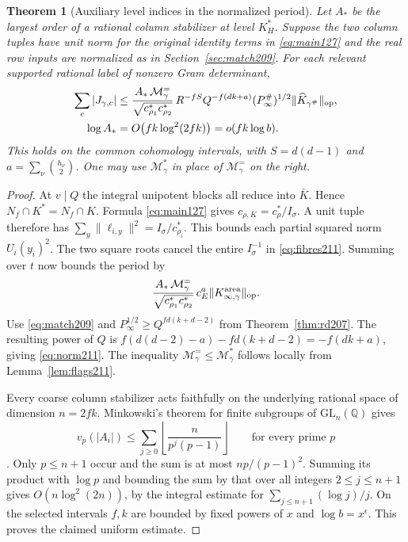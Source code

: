 \documentclass[a4paper,11pt]{article}
\newtheorem{theorem}[proposition]{Theorem}
\theoremstyle{definition}
\theoremstyle{remark}
\numberwithin{equation}{section}
\begin{document}
\begin{theorem}[Auxiliary level indices in the normalized period]
\label{thm:norm211}
Let \(A_*\) be the largest order of a rational column stabilizer
at level \(K_H^*\). Suppose the two column tuples have unit norm
for the original identity terms in \eqref{eq:main127} and the real
row inputs are normalized as in Section~\ref{sec:match209}. For
each relevant supported rational label of nonzero Gram determinant,
\begin{align}
 \sum_c|J_{\gamma,c}|
 &\le \frac{A_*\,\mathcal M_\gamma^{=}}
            {\sqrt{c_{\rho_1}^*c_{\rho_2}^*}}\,
    R^{-fS}Q^{-f(dk+a)}
       (P^\#_\infty)^{1/2}\|\widehat K_{\gamma^\#}\|_{\rm op},
                                                      \label{eq:norm211}\\
 \log A_*&=O\bigl(fk\log^2(2fk)\bigr)=o(fk\log b).
 \notag
\end{align}
This holds on the common cohomology intervals, with \(S=d(d-1)\)
and \(a=\sum_\nu\binom{h_\nu}{2}\). One may use
\(\mathcal M_\gamma^*\) in place of \(\mathcal M_\gamma^{=}\) on
the right.
\end{theorem}
\begin{proof}
At \(v\mid Q\) the integral unipotent blocks all reduce into
\(\bar K\). Hence \(N_f\cap K^*=N_f\cap K\). Formula
\eqref{eq:main127} gives \(c_{\rho,K}=c_\rho^*/I_\sigma\).
A unit tuple therefore has
\(\sum_y\|\ell_{i,y}\|^2=I_\sigma/c_{\rho_i}^*\). This bounds
each partial squared norm \(U_i(y_i)^2\). The two square roots
cancel the entire \(I_\sigma^{-1}\) in \eqref{eq:fibres211}.
Summing over \(t\) now bounds the period by
\[
   \frac{A_*\,\mathcal M_\gamma^{=}}
        {\sqrt{c_{\rho_1}^*c_{\rho_2}^*}}\,
                           c_E^a\|K_{\infty,\gamma}^{\rm area}\|_{\rm op}.
\]
Use \eqref{eq:match209} and \(P_\infty^{1/2}\ge Q^{fd(k+d-2)}\)
from Theorem~\ref{thm:rd207}. The resulting power of \(Q\) is
\(f(d(d-2)-a)-fd(k+d-2)=-f(dk+a)\), giving \eqref{eq:norm211}.
The inequality \(\mathcal M_\gamma^{=}\le\mathcal M_\gamma^*\)
follows locally from Lemma~\ref{lem:flags211}.

Every coarse column stabilizer acts faithfully on the underlying
rational space of dimension \(n=2fk\). Minkowski's theorem for
finite subgroups of \(\mathrm{GL}_n(\mathbb Q)\) gives
\[
 v_p(|A_i|)\le \sum_{j\ge0}
                \left\lfloor\frac{n}{p^j(p-1)}\right\rfloor
 \qquad\text{for every prime }p
\]
\cite[Lecture I, Theorem 1]{XIX-XIV-IV-serre211}. Only \(p\le n+1\) occur
and the sum is at most \(np/(p-1)^2\). Summing its product with
\(\log p\) and bounding the sum by that over all integers
\(2\le j\le n+1\) gives \(O(n\log^2(2n))\), by the integral
estimate for \(\sum_{j\le n+1}(\log j)/j\). On the selected
intervals \(f,k\) are bounded by fixed powers of \(x\) and
\(\log b=x^\epsilon\). This proves the claimed uniform estimate.
\end{proof}
\end{document}
